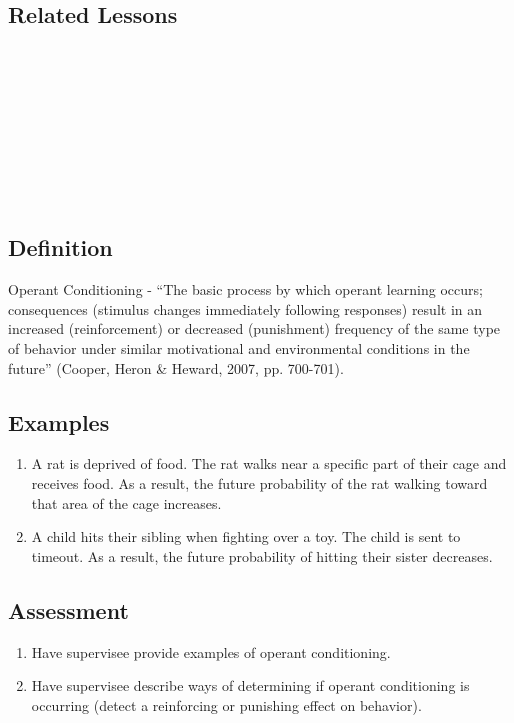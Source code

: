 \subsection{Related Lessons}
\fourFKTen{}\\
\fourFKThirteen{}\\
\fourFKFifteen{}\\
\fourFKSixteen{}\\
\fourFKSeventeen{}\\
\fourFKTwentyFour{}\\
\fourFKTwentySix{}\\
\fourFKThirtyFive{}\\
%
\subsection{Definition}
Operant Conditioning - ``The basic process by which operant learning occurs; consequences (stimulus changes immediately following responses) result in an increased (reinforcement) or decreased (punishment) frequency of the same type of behavior under similar motivational and environmental conditions in the future'' (Cooper, Heron \& Heward, 2007, pp. 700-701).
%
\subsection{Examples}
\begin{enumerate}
\item   A rat is deprived of food. The rat walks near a specific part of their cage and receives food. As a result, the future probability of the rat walking toward that area of the cage increases.
\item A child hits their sibling when fighting over a toy. The child is sent to timeout. As a result, the future probability of hitting their sister decreases.
%
\end{enumerate}
%
\subsection{Assessment}
\begin{enumerate}
\item Have supervisee provide examples of operant conditioning.
\item Have supervisee describe ways of determining if operant conditioning is occurring (detect a reinforcing or punishing effect on behavior).
%
\end{enumerate}
%
